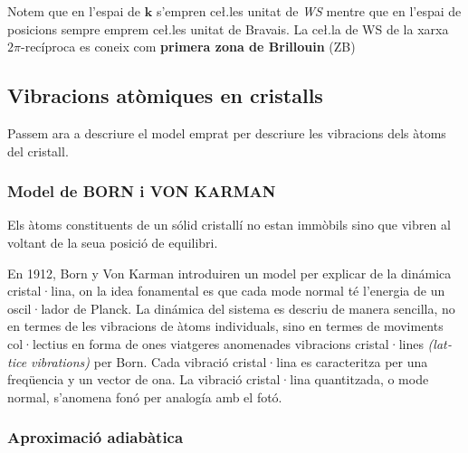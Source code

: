 \documentclass[12pt]{article} %
\let\vec\mathbf %
\begin{document}
Notem que en l'espai de $\vec k$ s'empren ce\l.les unitat de \emph{WS} mentre que en l'espai de posicions sempre emprem ce\l.les unitat de Bravais.
La ce\l.la de WS de la xarxa $2\pi$-recíproca es coneix com \textbf{primera zona de Brillouin} (ZB)


\subsection{Vibracions atòmiques en cristalls}
Passem ara a descriure el model emprat per descriure les vibracions dels àtoms del cristall.
\subsubsection{Model de BORN i VON KARMAN}
Els àtoms constituents de un sólid cristallí no estan immòbils sino que vibren al voltant de la seua posició de equilibri.

En 1912, Born y Von Karman \cite{Born:1912:SRG} introduiren un model per explicar de la dinámica cristal·lina, on la idea fonamental es que cada mode normal té l'energia de un oscil·lador de Planck. La dinámica del sistema es descriu de manera sencilla, no en termes de les vibracions de àtoms individuals, sino en termes de moviments col·lectius en forma de ones viatgeres anomenades vibracions cristal·lines \emph{(\foreignlanguage{english}{lattice vibrations})} per Born. Cada vibració cristal·lina es caracteritza per una freqüencia y un vector de ona.
La vibració cristal·lina quantitzada, o mode normal, s'anomena fonó per analogía amb el fotó. %


\subsubsection{Aproximació adiabàtica}
\end{document}
